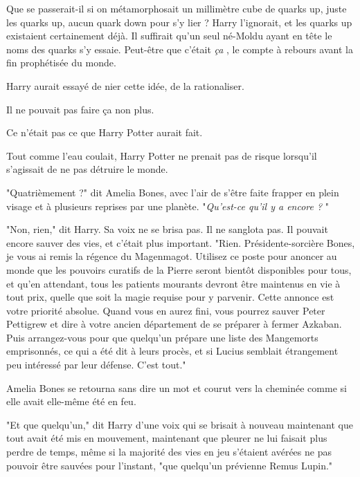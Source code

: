 Que se passerait-il si on métamorphosait un millimètre cube de quarks up, juste les quarks up, aucun quark down pour s'y lier ? Harry l'ignorait, et les quarks up existaient certainement déjà. Il suffirait qu'un seul né-Moldu ayant en tête le noms des quarks s'y essaie. Peut-être que c'était \emph{ça} , le compte à rebours avant la fin prophétisée du monde.

Harry aurait essayé de nier cette idée, de la rationaliser.

Il ne pouvait pas faire ça non plus.

Ce n'était pas ce que Harry Potter aurait fait.

Tout comme l'eau coulait, Harry Potter ne prenait pas de risque lorsqu'il s'agissait de ne pas détruire le monde.

"Quatrièmement ?" dit Amelia Bones, avec l'air de s'être faite frapper en plein visage et à plusieurs reprises par une planète. "\emph{Qu'est-ce qu'il y a encore ?} "

"Non, rien," dit Harry. Sa voix ne se brisa pas. Il ne sanglota pas. Il pouvait encore sauver des vies, et c'était plus important. "Rien. Présidente-sorcière Bones, je vous ai remis la régence du Magenmagot. Utilisez ce poste pour anoncer au monde que les pouvoirs curatifs de la Pierre seront bientôt disponibles pour tous, et qu'en attendant, tous les patients mourants devront être maintenus en vie à tout prix, quelle que soit la magie requise pour y parvenir. Cette annonce est votre priorité absolue. Quand vous en aurez fini, vous pourrez sauver Peter Pettigrew et dire à votre ancien département de se préparer à fermer Azkaban. Puis arrangez-vous pour que quelqu'un prépare une liste des Mangemorts emprisonnés, ce qui a été dit à leurs procès, et si Lucius semblait étrangement peu intéressé par leur défense. C'est tout."

Amelia Bones se retourna sans dire un mot et courut vers la cheminée comme si elle avait elle-même été en feu.

"Et que quelqu'un," dit Harry d'une voix qui se brisait à nouveau maintenant que tout avait été mis en mouvement, maintenant que pleurer ne lui faisait plus perdre de temps, même si la majorité des vies en jeu s'étaient avérées ne pas pouvoir être sauvées pour l'instant, "que quelqu'un prévienne Remus Lupin."

